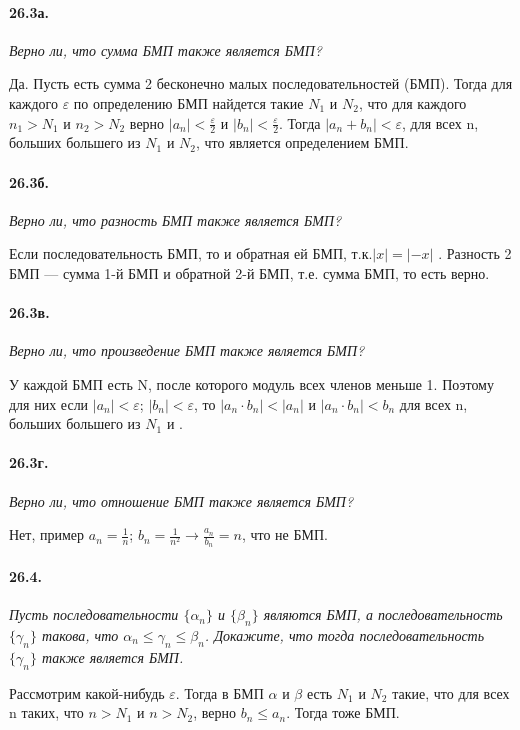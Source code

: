 \documentclass{book}
\begin{document}
\paragraph{26.3а.}
\textit{Верно ли, что сумма БМП также является БМП?}

Да. Пусть есть сумма 2 бесконечно малых последовательностей (БМП). Тогда для каждого $\varepsilon$ по определению БМП найдется такие $N_1$ и $N_2$, что для каждого $n_1 > N_1$ и $n_2 > N_2$ верно $|a_n|<\frac{\varepsilon}{2}$ и $|b_n|<\frac{\varepsilon}{2}$. Тогда $|a_n + b_n| < \varepsilon$, для всех n, больших большего из $N_1$ и $N_2 $, что является определением БМП.

\paragraph{26.3б.}
\textit{Верно ли, что разность БМП также является БМП?}

Если последовательность БМП, то и обратная ей БМП, т.к.$|x| = |-x|$ . Разность 2 БМП — сумма 1-й БМП и обратной 2-й БМП, т.е. сумма БМП, то есть верно.

\paragraph{26.3в.}
\textit{Верно ли, что произведение БМП также является БМП?}

У каждой БМП есть N, после которого модуль всех членов меньше 1. Поэтому для них если $|a_n|<\varepsilon$; $|b_n|<\varepsilon$, то $|a_n \cdot b_n|<|a_n|$ и $|a_n \cdot b_n| < b_n$ для всех n, больших большего из $N_1$ и . 

\paragraph{26.3г.}
\textit{Верно ли, что отношение БМП также является БМП?}

Нет, пример $a_n = \frac{1}{n}$; $b_n =\frac{1}{n^2} \rightarrow \frac{a_n}{b_n} = n$, что не БМП.

\paragraph{26.4.}
\textit{Пусть последовательности $\{\alpha_n\}$ и $\{\beta_n\}$ являются БМП, а последовательность $\{\gamma_n\}$ такова, что $\alpha_n \leq \gamma_n \leq \beta_n$. Докажите, что тогда последовательность $\{\gamma_n\}$ также является БМП.}

Рассмотрим какой-нибудь $\varepsilon$. Тогда в БМП $\alpha$ и $\beta$ есть $N_1$ и $N_2$ такие, что для всех n таких, что $n>N_1$ и $n>N_2$, верно $b_n \le a_n $. Тогда тоже БМП.
\end{document}
